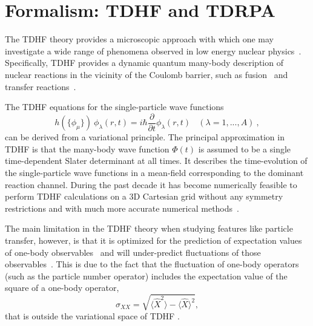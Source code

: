 \documentclass[reprint,aps,prc,twocolumn,superscriptaddress,floatfix,10pt]{revtex4-2}
\begin{document}


\section{Formalism: TDHF and TDRPA} \label{sec:TDHF}

The TDHF theory provides a microscopic approach with which one may investigate a wide range of phenomena observed in low energy nuclear physics~\cite{negele1982,simenel2012,simenel2018,sekizawa2019}.
Specifically, TDHF provides a dynamic quantum many-body description of nuclear reactions in the vicinity of the Coulomb barrier, such as fusion~\cite{bonche1978,flocard1978,simenel2001,umar2006d,washiyama2008,umar2010a,umar2009a,guo2012,keser2012,simenel2013a,oberacker2012,oberacker2010,umar2012a,simenel2013b,umar2014a,jiang2014} 
and transfer reactions~\cite{koonin1977,simenel2010,simenel2011,umar2008a,sekizawa2013,scamps2013a,sekizawa2014,bourgin2016,umar2017,sekizawa2019}.

The TDHF equations for the single-particle wave functions
\begin{equation}
h(\{\phi_{\mu}\}) \ \phi_{\lambda} (r,t) = i \hbar \frac{\partial}{\partial t} \phi_{\lambda} (r,t)
\ \ \ \ (\lambda = 1,...,A) \ ,
\label{eq:TDHF}
\end{equation}
can be derived from a variational principle.
The principal approximation in TDHF is that the many-body wave function $\Phi(t)$  is assumed to be a single time-dependent Slater determinant at all times.
It describes the time-evolution of the single-particle wave functions in a mean-field corresponding to the dominant reaction channel.
During the past decade it has become numerically feasible to perform TDHF calculations on a 3D Cartesian grid without any symmetry restrictions and with much more accurate numerical methods~\cite{bottcher1989,umar2006c,sekizawa2013,maruhn2014}.

The main limitation in the TDHF theory when studying features like particle transfer, however, is that it is optimized for the prediction of expectation values of one-body observables~\cite{balian1981} and will under-predict fluctuations of those observables~\cite{dasso1979}. 
This is due to the fact that the fluctuation of one-body operators (such as the particle number operator) includes the expectation value of the square of a one-body operator,
\begin{equation}
\sigma_{XX}=\sqrt{\langle\hat{X}^2\rangle - \langle\hat{X}\rangle^2},
\label{eq:fluc}
\end{equation}
that is outside the variational space of TDHF \cite{balian1981}.
\end{document}
